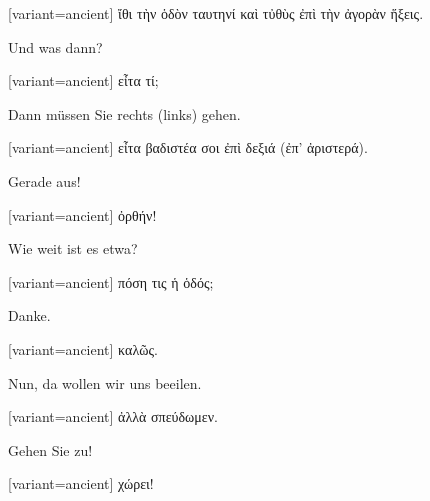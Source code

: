 \switchcolumn

\begin{greek}[variant=ancient]%
ἴθι τὴν ὁδὸν ταυτηνί καὶ τὐθὺς ἐπὶ τὴν ἀγορὰν ἥξεις.

\end{greek}%
\switchcolumn*

Und was dann?

\switchcolumn

\begin{greek}[variant=ancient]%
εἶτα τί;

\end{greek}%
\switchcolumn*

Dann müssen Sie rechts (links) gehen.

\switchcolumn

\begin{greek}[variant=ancient]%
εἶτα βαδιστέα σοι ἐπὶ δεξιά (ἐπ' ἀριστερά).

\end{greek}%
\switchcolumn*

Gerade aus!

\switchcolumn

\begin{greek}[variant=ancient]%
ὀρθήν!

\end{greek}%
\switchcolumn*

Wie weit ist es etwa?

\switchcolumn

\begin{greek}[variant=ancient]%
πόση τις ἡ ὁδός;

\end{greek}%
\switchcolumn*

Danke.

\switchcolumn

\begin{greek}[variant=ancient]%
καλῶς.

\end{greek}%
\switchcolumn*

Nun, da wollen wir uns beeilen.

\switchcolumn

\begin{greek}[variant=ancient]%
ἀλλὰ σπεύδωμεν.

\end{greek}%
\switchcolumn*

Gehen Sie zu!

\switchcolumn

\begin{greek}[variant=ancient]%
χώρει!

\end{greek}%
\switchcolumn*

